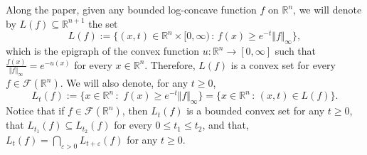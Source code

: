 \documentclass{amsart}
\newcommand{\R}{\mathbb R}
\newtheorem{lemma}{Lemma}[section]
\theoremstyle{remark}
\theoremstyle{definition}
\numberwithin{equation}{section}
\begin{document}


Along the paper, given any bounded log-concave function $f$ on $\R^n$, we will denote by $L(f)\subseteq \R^{n+1}$ the set
$$
L(f):=\{(x,t)\in\R^n\times[0,\infty)\,:\, f(x)\geq e^{-t}\Vert f\Vert_\infty\},
$$
which is the epigraph of the convex function $u:\R^n\to[0,\infty]$ such that $\frac{f(x)}{\Vert f\Vert_\infty}=e^{-u(x)}$ for every $x\in\R^n$. Therefore, $L(f)$ is a convex set for every $f\in\mathcal{F}(\R^n)$. We will also denote, for any $t\geq 0$,
$$
L_t(f):=\{x\in\R^n\,:\,\,f(x)\geq e^{-t}\Vert f\Vert_\infty\}=\{x\in\R^n\,:\,(x,t)\in L(f)\}.
$$
Notice that if $f\in\mathcal{F}(\R^n)$, then $L_t(f)$ is a bounded convex set for any $t\geq0$, that $L_{t_1}(f)\subseteq L_{t_2}(f)$ for every $0\leq t_1\leq t_2$, and that, $L_t(f)=\bigcap_{\varepsilon>0}L_{t+\varepsilon}(f)$ for any $t\geq0$.
\end{document}
